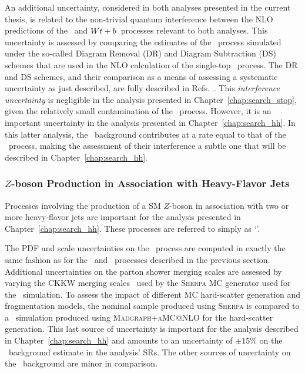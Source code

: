 An additional uncertainty, considered in both analyses presented in the current thesis, is related
to the non-trivial quantum interference between the NLO predictions of the \ttbar~and $Wt+b$~processes relevant
to both analyses.
This uncertainty is assessed by comparing the estimates of the \wt~process simulated
under the so-called Diagram Removal (DR) and Diagram Subtraction (DS) schemes that
are used in the NLO calculation of the single-top \wt~process.
The DR and DS schemes, and their comparison as a means of assessing a systematic uncertainty
as just described, are fully described in Refs.~\cite{Frixione:2008yi,ATL-PHYS-PUB-2016-004}.
This \textit{interference uncertainty} is negligible in the analysis presented in Chapter~\ref{chap:search_stop},
given the relatively small contamination of the \wt~process.
However, it is an important uncertainty in the analysis presented in Chapter~\ref{chap:search_hh}.
In this latter analysis, the \wt~background contributes at a rate equal to that of the \ttbar~process, making
the assessment of their interference a subtle one that will be described in Chapter~\ref{chap:search_hh}.

\subsubsection{$Z$-boson Production in Association with Heavy-Flavor Jets}

Processes involving the production of a SM $Z$-boson in association with
two or more heavy-flavor jets are important for the analysis presented in Chapter~\ref{chap:search_hh}.
These processes are referred to simply as `\zhf'.

The PDF and scale uncertainties on the \zhf~process are computed in exactly the
same fashion as for the \ttbar~and \wt~processes described in the previous section.
Additional uncertainties on the parton shower merging scales are assessed by varying
the CKKW merging scales~\cite{Lonnblad:2012ix} used by the \textsc{Sherpa} MC generator
used for the \zhf~simulation.
To assess the impact of different MC hard-scatter generation and fragmentation models, the 
nominal sample produced using \textsc{Sherpa} is compared to a \zhf~simulation produced using
\textsc{Madgraph+aMC@NLO} for the hard-scatter generation.
This last source of uncertainty is important for the analysis described in Chapter~\ref{chap:search_hh}
and amounts to an uncertainty of $\pm 15$\% on the \zhf~background estimate in the analysis' SRs.
The other sources of uncertainty on the \zhf~background are minor in comparison.


